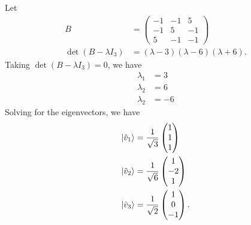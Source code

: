 \documentclass[10pt]{mypackage}
\begin{document}
\begin{example}
  \renewcommand{\arraystretch}{1.5}
  Let
  \begin{align*}
    B &= \begin{pmatrix}-1 & -1 & 5 \\ -1 & 5 & -1 \\ 5 & -1 & -1\end{pmatrix}\\
    \det\left(B - \lambda I_{3}\right) &= \left(\lambda - 3\right)\left(\lambda - 6\right)\left(\lambda + 6\right).
  \end{align*}
  Taking $\det\left(B - \lambda I_{3}\right) = 0$, we have
  \begin{align*}
    \lambda_1 &= 3\\
    \lambda_2 &= 6\\
    \lambda_2 &= -6
  \end{align*}
  Solving for the eigenvectors, we have
  \begin{align*}
    \ket{\hat{v}_1} &= \frac{1}{\sqrt{3}}\begin{pmatrix}1\\1\\1\end{pmatrix}\\
    \ket{\hat{v}_2} &= \frac{1}{\sqrt{6}} \begin{pmatrix}1\\-2\\1\end{pmatrix}\\
    \ket{\hat{v}_3} &= \frac{1}{\sqrt{2}}\begin{pmatrix}1\\0\\-1\end{pmatrix}.
  \end{align*}
\end{example}
\end{document}
